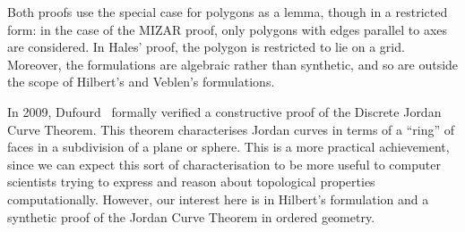 Both proofs use the special case for polygons as a lemma, though in a restricted form: in the case of the MIZAR proof, only polygons with edges parallel to axes are considered. In Hales' proof, the polygon is restricted to lie on a grid. Moreover, the formulations are algebraic rather than synthetic, and so are outside the scope of Hilbert's and Veblen's formulations.

In 2009, Dufourd~\cite{DufourdJordanCurve} formally verified a constructive proof of the Discrete Jordan Curve Theorem. This theorem characterises Jordan curves in terms of a ``ring'' of faces in a subdivision of a plane or sphere. This is a more practical achievement, since we can expect this sort of characterisation to be more useful to computer scientists trying to express and reason about topological properties computationally. However, our interest here is in Hilbert's formulation and a synthetic proof of the Jordan Curve Theorem in ordered geometry.





